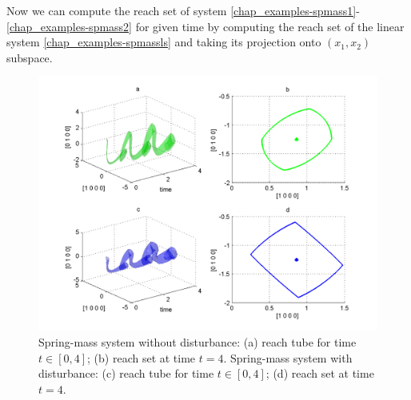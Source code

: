 \documentclass[letterpaper,10pt,english]{sphinxmanual}
\begin{document}
Now we can compute the reach set of system \eqref{chap_examples-spmass1}-\eqref{chap_examples-spmass2} for
given time by computing the reach set of the linear system \eqref{chap_examples-spmassls}
and taking its projection onto $(x_1, x_2)$ subspace.
\begin{figure}[htbp]
\centering
\capstart

\includegraphics[width=0.700\linewidth]{chapter06_section02_reachmech.png}
\caption{Spring-mass system without disturbance:
(a) reach tube for time $t\in[0,4]$; (b) reach set at time $t=4$.
Spring-mass system with disturbance:
(c) reach tube for time $t\in[0,4]$; (d) reach set at time $t=4$.}\label{chap_examples:mechreachfig}\end{figure}
\end{document}
